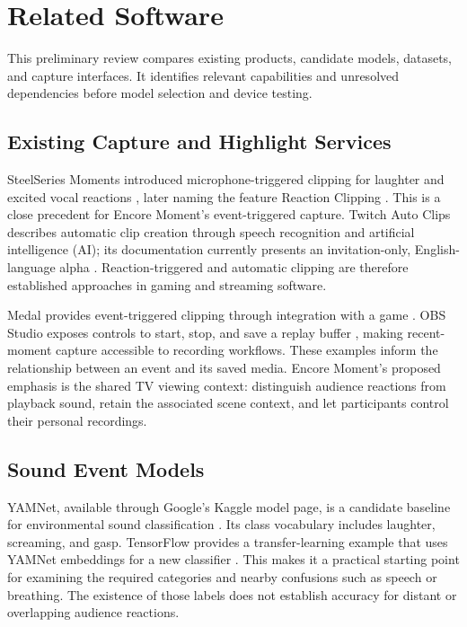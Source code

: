 \section{Related Software}

This preliminary review compares existing products, candidate models, datasets, and capture interfaces. It identifies relevant capabilities and unresolved dependencies before model selection and device testing.

\subsection{Existing Capture and Highlight Services}

SteelSeries Moments introduced microphone-triggered clipping for laughter and excited vocal reactions \cite{ref2}, later naming the feature Reaction Clipping \cite{ref3}. This is a close precedent for Encore Moment's event-triggered capture. Twitch Auto Clips describes automatic clip creation through speech recognition and artificial intelligence (AI); its documentation currently presents an invitation-only, English-language alpha \cite{ref4}. Reaction-triggered and automatic clipping are therefore established approaches in gaming and streaming software.

Medal provides event-triggered clipping through integration with a game \cite{ref5}. OBS Studio exposes controls to start, stop, and save a replay buffer \cite{ref6}, making recent-moment capture accessible to recording workflows. These examples inform the relationship between an event and its saved media. Encore Moment's proposed emphasis is the shared TV viewing context: distinguish audience reactions from playback sound, retain the associated scene context, and let participants control their personal recordings.

\subsection{Sound Event Models}

YAMNet, available through Google's Kaggle model page, is a candidate baseline for environmental sound classification \cite{ref7}. Its class vocabulary includes laughter, screaming, and gasp. TensorFlow provides a transfer-learning example that uses YAMNet embeddings for a new classifier \cite{ref8}. This makes it a practical starting point for examining the required categories and nearby confusions such as speech or breathing. The existence of those labels does not establish accuracy for distant or overlapping audience reactions.

